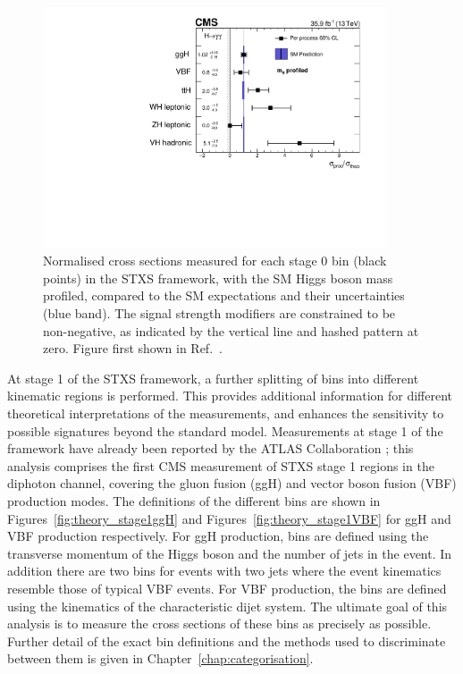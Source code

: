 \begin{figure}[hptb]
  \centering
  \includegraphics[width=0.9\textwidth]{Figures/Theory/PerProcSTXS.pdf}
  \caption[Stage 0 simplified template cross section measurements from Ref.~\cite{HIG-16-040}.]
  {
    Normalised cross sections measured for each stage 0 bin (black points) 
    in the STXS framework, 
    with the SM Higgs boson mass profiled, 
    compared to the SM expectations and their uncertainties (blue band). 
    The signal strength modifiers are constrained to be non-negative, 
    as indicated by the vertical line and hashed pattern at zero.
    Figure first shown in Ref.~\cite{HIG-16-040}.
  }
  \label{fig:theory_PerProcSTXS}
\end{figure}

At stage 1 of the STXS framework, 
a further splitting of bins into different kinematic regions is performed.
This provides additional information for different theoretical interpretations of the measurements, 
and enhances the sensitivity to possible signatures beyond the standard model.
Measurements at stage 1 of the framework have already been reported by the ATLAS Collaboration \cite{ATLAS_Hgg36,ATLAS_Hgg80,ATLASstage0_ZZ}; 
this analysis comprises the first CMS measurement of STXS stage 1 regions in the diphoton channel, 
covering the gluon fusion (ggH) and vector boson fusion (VBF) production modes.
The definitions of the different bins are shown in 
Figures~\ref{fig:theory_stage1ggH} and Figures~\ref{fig:theory_stage1VBF} 
for ggH and VBF production respectively.
For ggH production, bins are defined using the transverse momentum of the Higgs boson
and the number of jets in the event. 
In addition there are two bins for events with two jets where the event kinematics
resemble those of typical VBF events.
For VBF production, the bins are defined using the kinematics 
of the characteristic dijet system.
The ultimate goal of this analysis is to measure the cross sections of these bins 
as precisely as possible.
Further detail of the exact bin definitions 
and the methods used to discriminate between them is given in Chapter~\ref{chap:categorisation}.

